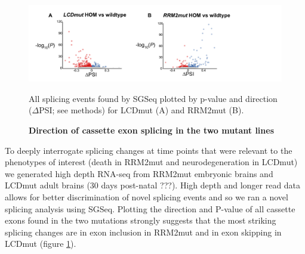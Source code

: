 \begin{figure}[h!]
	\centering
	\includegraphics[width=18cm]{Figures/05_tdp_mice/transcriptome_scatters.png}
	\caption{\textbf{Direction of cassette exon splicing in the two mutant lines}}
	All splicing events found by SGSeq plotted by p-value and direction ($\Delta$PSI; see methods) for LCDmut (A) and RRM2mut (B).
	\label{fig:cassette_scatters}
\end{figure}

To deeply interrogate splicing changes at time points that were relevant to the phenotypes of interest (death in RRM2mut and neurodegeneration in LCDmut) we generated high depth RNA-seq from RRM2mut embryonic brains and LCDmut adult brains (30 days post-natal ???). High depth and longer read data allows for better discrimination of novel splicing events and so we ran a novel splicing analysis using SGSeq. Plotting the direction and P-value of all cassette exons found in the two mutations strongly suggests that the most striking splicing changes are in exon inclusion in RRM2mut and in exon skipping in LCDmut (figure \ref{fig:cassette_scatters}).

